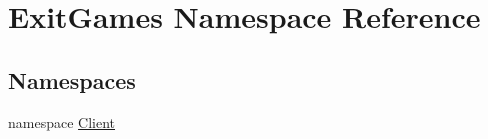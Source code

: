 \hypertarget{namespace_exit_games}{}\section{Exit\+Games Namespace Reference}
\label{namespace_exit_games}
\subsection*{Namespaces}
\begin{DoxyCompactItemize}
\item 
namespace \hyperlink{namespace_exit_games_1_1_client}{Client}
\end{DoxyCompactItemize}
